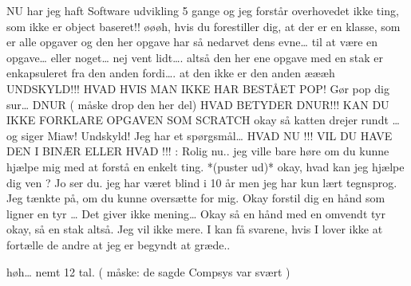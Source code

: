 \documentclass[a4paper,11pt]{article}
\begin{document}
\begin{sketch}
 NU har jeg haft Software udvikling 5 gange og jeg forstår overhovedet ikke ting, som ikke er object baseret!!
 øøøh, hvis du forestiller dig, at der er en klasse, som er alle opgaver og den her opgave har så nedarvet dens evne… til at være en opgave… eller noget…  nej vent lidt…. altså den her ene opgave med en stak er enkapsuleret fra den anden fordi…. at den ikke er den anden æææh
 UNDSKYLD!!! HVAD HVIS MAN IKKE HAR BESTÅET POP!
 Gør pop dig sur… DNUR ( måske drop den her del)
 HVAD BETYDER DNUR!!! KAN DU IKKE FORKLARE OPGAVEN SOM SCRATCH
 okay så katten drejer rundt … og siger Miaw! 
 Undskyld! Jeg har et spørgsmål…
 HVAD NU !!! VIL DU HAVE DEN I BINÆR ELLER HVAD !!!
: Rolig nu.. jeg ville bare høre om du kunne hjælpe mig med at forstå en enkelt ting.
 *(puster ud)* okay, hvad kan jeg hjælpe dig ven ?
 Jo ser du. jeg har været blind i 10 år men jeg har kun lært tegnsprog. Jeg tænkte på, om du kunne oversætte for mig.
 Okay forstil dig en hånd som ligner en tyr …
 Det giver ikke mening…
 Okay så en hånd med en omvendt tyr
 okay, så en stak altså.
 Jeg vil ikke mere. I kan få svarene, hvis I lover ikke at fortælle de andre at jeg er begyndt at græde..

 høh… nemt 12 tal. ( måske: de sagde Compsys var svært )
\end{sketch}
\end{document}
